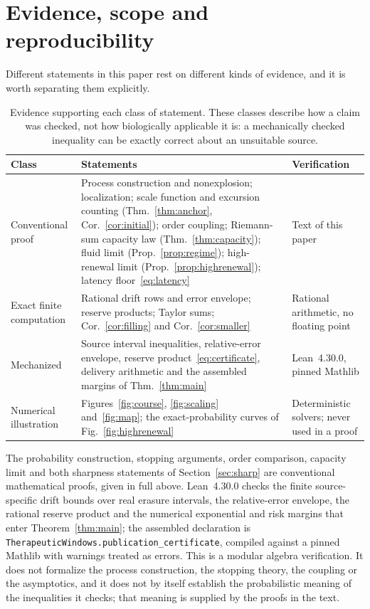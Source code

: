 \section{Evidence, scope and reproducibility}\label{sec:evidence}
Different statements in this paper rest on different kinds of evidence, and it is worth separating them explicitly.

\begin{table}[htb]
\centering\small
\caption{Evidence supporting each class of statement. These classes describe how a claim was checked, not how biologically applicable it is: a mechanically checked inequality can be exactly correct about an unsuitable source.}\label{tab:evidence}
\begin{tabularx}{\linewidth}{@{}l >{\raggedright\arraybackslash}X l@{}}
\toprule
Class & Statements & Verification\\
\midrule
Conventional proof & Process construction and nonexplosion; localization; scale function and excursion counting (Thm.~\ref{thm:anchor}, Cor.~\ref{cor:initial}); order coupling; Riemann-sum capacity law (Thm.~\ref{thm:capacity}); fluid limit (Prop.~\ref{prop:regime}); high-renewal limit (Prop.~\ref{prop:highrenewal}); latency floor~\eqref{eq:latency} & Text of this paper\\
Exact finite computation & Rational drift rows and error envelope; reserve products; Taylor sums; Cor.~\ref{cor:filling} and Cor.~\ref{cor:smaller} & Rational arithmetic, no floating point\\
Mechanized & Source interval inequalities, relative-error envelope, reserve product~\eqref{eq:certificate}, delivery arithmetic and the assembled margins of Thm.~\ref{thm:main} & Lean~4.30.0, pinned Mathlib\\
Numerical illustration & Figures~\ref{fig:course}, \ref{fig:scaling} and~\ref{fig:map}; the exact-probability curves of Fig.~\ref{fig:highrenewal} & Deterministic solvers; never used in a proof\\
\bottomrule
\end{tabularx}
\end{table}

The probability construction, stopping arguments, order comparison, capacity limit and both sharpness statements of Section~\ref{sec:sharp} are conventional mathematical proofs, given in full above. Lean~4.30.0 checks the finite source-specific drift bounds over real erasure intervals, the relative-error envelope, the rational reserve product and the numerical exponential and risk margins that enter Theorem~\ref{thm:main}; the assembled declaration is \texttt{TherapeuticWindows.publication\_certificate}, compiled against a pinned Mathlib with warnings treated as errors. This is a modular algebra verification. It does not formalize the process construction, the stopping theory, the coupling or the asymptotics, and it does not by itself establish the probabilistic meaning of the inequalities it checks; that meaning is supplied by the proofs in the text.

